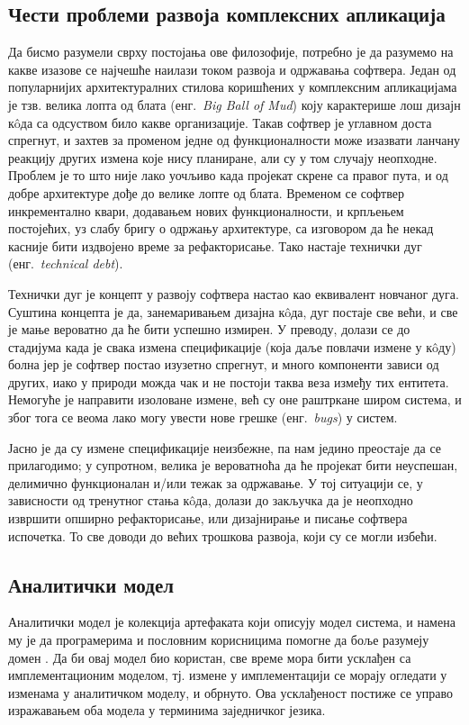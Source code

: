 \documentclass[12pt,oneside]{memoir}
\begin{document}
\subsection{Чести проблеми развоја комплексних апликација}
Да бисмо разумели сврху постојања ове филозофије, потребно је да разумемо на какве изазове се најчешће наилази током развоја и одржавања софтвера. Један од популарнијих архитектуралних стилова коришћених у комплексним апликацијама је тзв. велика лопта од блата (енг.~\textit{Big Ball of Mud}) коју карактерише лош дизајн кôда са одсуством било какве организације. Такав софтвер је углавном доста спрегнут, и захтев за променом једне од функционалности може изазвати ланчану реакцију других измена које нису планиране, али су у том случају неопходне. Проблем је то што није лако уочљиво када пројекат скрене са правог пута, и од добре архитектуре дође до велике лопте од блата. Временом се софтвер инкрементално квари, додавањем нових функционалности, и крпљењем постојећих, уз слабу бригу о одржању архитектуре, са изговором да ће некад касније бити издвојено време за рефакторисање. Тако настаје технички дуг (енг.~\textit{technical debt}).

Технички дуг је концепт у развоју софтвера настао као еквивалент новчаног дуга. Суштина концепта је да, занемаривањем дизајна кôда, дуг постаје све већи, и све је мање вероватно да ће бити успешно измирен. У преводу, долази се до стадијума када је свака измена спецификације (која даље повлачи измене у кôду) болна јер је софтвер постао изузетно спрегнут, и много компоненти зависи од других, иако у природи можда чак и не постоји таква веза између тих ентитета. Немогуће је направити изоловане измене, већ су оне раштркане широм система, и због тога се веома лако могу увести нове грешке (енг.~\textit{bugs}) у систем.

Јасно је да су измене спецификације неизбежне, па нам једино преостаје да се прилагодимо; у супротном, велика је вероватноћа да ће пројекат бити неуспешан, делимично функционалан и/или тежак за одржавање. У тој ситуацији се, у зависности од тренутног стања кôда, долази до закључка да је неопходно извршити опширно рефакторисање, или дизајнирање и писање софтвера испочетка. То све доводи до већих трошкова развоја, који су се могли избећи.

\subsection{Аналитички модел}
Аналитички модел је колекција артефаката који описују модел система, и намена му је да програмерима и пословним корисницима помогне да боље разумеју домен \cite{DomainDrivenDessign}. Да би овај модел био користан, све време мора бити усклађен са имплементационим моделом, тј. измене у имплементацији се морају огледати у изменама у аналитичком моделу, и обрнуто. Ова усклађеност постиже се управо изражавањем оба модела у терминима заједничког језика.
\end{document}
